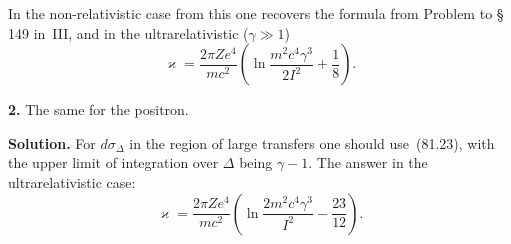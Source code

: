 In the non-relativistic case from this one recovers the formula from Problem to \S\,149 in~III, and in the ultrarelativistic ($\gamma \gg 1$)
\begin{equation}
\varkappa = \frac{2\pi Ze^4}{mc^2}\left(\ln\frac{m^2c^4\gamma^3}{2I^2} + \frac{1}{8}\right). \tag{2}
\end{equation}

\textbf{2.} The same for the positron.

\textbf{Solution.} For $d\sigma_\Delta$ in the region of large transfers one should use~(81.23), with the upper limit of integration over $\Delta$ being $\gamma - 1$. The answer in the ultrarelativistic case:
\[
\varkappa = \frac{2\pi Ze^4}{mc^2}\left(\ln\frac{2m^2c^4\gamma^3}{I^2} - \frac{23}{12}\right).
\]
